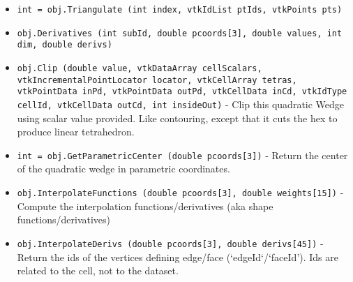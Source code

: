 \begin{itemize}
\item  \verb|int = obj.Triangulate (int index, vtkIdList ptIds, vtkPoints pts)|

\item  \verb|obj.Derivatives (int subId, double pcoords[3], double values, int dim, double derivs)|

\item  \verb|obj.Clip (double value, vtkDataArray cellScalars, vtkIncrementalPointLocator locator, vtkCellArray tetras, vtkPointData inPd, vtkPointData outPd, vtkCellData inCd, vtkIdType cellId, vtkCellData outCd, int insideOut)| -  Clip this quadratic Wedge using scalar value provided. Like
 contouring, except that it cuts the hex to produce linear
 tetrahedron.

\item  \verb|int = obj.GetParametricCenter (double pcoords[3])| -  Return the center of the quadratic wedge in parametric coordinates.

\item  \verb|obj.InterpolateFunctions (double pcoords[3], double weights[15])| -  Compute the interpolation functions/derivatives
 (aka shape functions/derivatives)

\item  \verb|obj.InterpolateDerivs (double pcoords[3], double derivs[45])| -  Return the ids of the vertices defining edge/face (`edgeId`/`faceId').
 Ids are related to the cell, not to the dataset.

\end{itemize}
